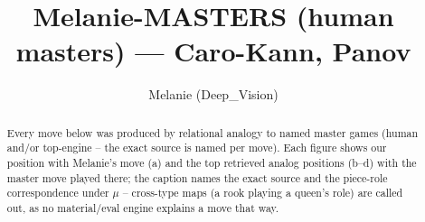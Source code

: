\documentclass[11pt]{article}
\title{Melanie-MASTERS (human masters) — Caro-Kann, Panov}
\author{Melanie (Deep\_Vision)}
\date{}
\begin{document}
\maketitle

\begin{abstract}Every move below was produced by relational analogy to named master games (human and/or top-engine -- the exact source is named per move). Each figure shows our position with Melanie's move (a) and the top retrieved analog positions (b--d) with the master move played there; the caption names the exact source and the piece-role correspondence under $\mu$ -- cross-type maps (a rook playing a queen's role) are called out, as no material/eval engine explains a move that way.\end{abstract}

\begin{figure}[p]\centering
\begin{subfigure}{0.46\textwidth}\centering
\resizebox{\linewidth}{!}{%
\newchessgame
\chessboard[
  setfen={rnbqk1r1/pp2bppp/4pn2/2Pp4/3P4/2N2N2/PP3PPP/1RBQKB1R b Kq - 2 8},
  showmover=false,
  pgfstyle=straightmove, color=movearrow, markmove={f6-h5}
]}
\caption{}
\end{subfigure}\hfill
\begin{subfigure}{0.46\textwidth}\centering
\resizebox{\linewidth}{!}{%
\newchessgame
\chessboard[
  setfen={r1bqr1k1/pp2bppp/2pp1n2/4n3/P2NP3/2N4P/BPP2PP1/R1BQR1K1 b - - 0 11},
  showmover=false,
  pgfstyle=straightmove, color=movearrow, markmove={e5-g6}
]}
\caption{}
\end{subfigure}
\\[4pt]
\begin{subfigure}{0.46\textwidth}\centering
\resizebox{\linewidth}{!}{%
\newchessgame
\chessboard[
  setfen={r1bqr1k1/pp2bppp/2pp1n2/4n3/P2NP3/2N4P/BPP2PP1/R1BQR1K1 b - - 0 11},
  showmover=false,
  pgfstyle=straightmove, color=movearrow, markmove={e5-g6}
]}
\caption{}
\end{subfigure}\hfill
\begin{subfigure}{0.46\textwidth}\centering
\resizebox{\linewidth}{!}{%
\newchessgame
\chessboard[
  setfen={2kr1b1r/pppb2pp/2n2nq1/8/2B1p3/1PN1P2P/PB1NQPP1/R3K2R w KQ - 2 14},
  showmover=false,
  pgfstyle=straightmove, color=movearrow, markmove={e1-c1}
]}
\caption{}
\end{subfigure}

\end{figure}
\end{document}
